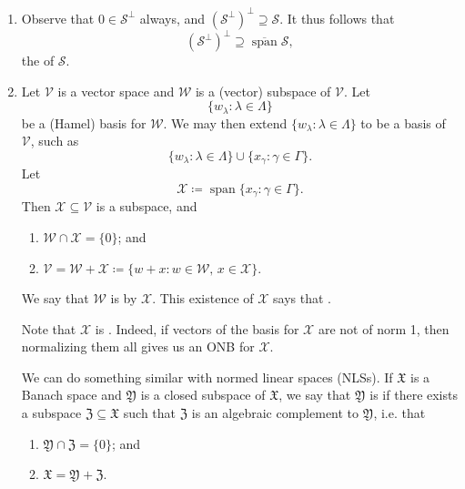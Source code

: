 \documentclass[notoc,notitlepage]{tufte-book}
\DeclareMathOperator{\Span}{span}
\begin{document}
\begin{remark}
  \begin{enumerate}
    \item Observe that $0 \in \mathcal{S}^{\perp}$ always,
      and $(\mathcal{S}^{\perp})^{\perp} \supseteq \mathcal{S}$.
      It thus follows that
      \begin{equation*}
        \left( \mathcal{S}^{\perp} \right)^{\perp} \supseteq \overline{\Span} \mathcal{S},
      \end{equation*}
      the  of $\mathcal{S}$.

    \item Let $\mathcal{V}$ is a vector space
      and $\mathcal{W}$ is a (vector) subspace of $\mathcal{V}$.
      Let
      \begin{equation*}
        \{ w_{\lambda} : \lambda \in \Lambda \}
      \end{equation*}
      be a (Hamel) basis for $\mathcal{W}$.
      We may then extend $\{ w_\lambda : \lambda \in \Lambda \}$
      to be a basis of $\mathcal{V}$, such as
      \begin{equation*}
        \{ w_\lambda : \lambda \in \Lambda \} \cup \{ x_\gamma : \gamma \in
        \Gamma \}.
      \end{equation*}
      Let
      \begin{equation*}
        \mathcal{X} \coloneqq \Span \{ x_\gamma : \gamma \in \Gamma \}.
      \end{equation*}
      Then $\mathcal{X} \subseteq \mathcal{V}$ is a subspace,
      and
      \begin{enumerate}
        \item $\mathcal{W} \cap \mathcal{X} = \{ 0 \}$; and
        \item $\mathcal{V} = \mathcal{W} + \mathcal{X} \coloneqq \{ w + x : w
          \in \mathcal{W},\, x \in \mathcal{X} \}$.
      \end{enumerate}
      We say that $\mathcal{W}$ is
       by $\mathcal{X}$.
      This existence of $\mathcal{X}$ says that .

      Note that $\mathcal{X}$ is .
      Indeed, if vectors of the basis for $\mathcal{X}$
      are not of norm 1, then normalizing them all
      gives us an ONB for $\mathcal{X}$.

      We can do something similar with normed linear spaces (NLSs).
      If $\mathfrak{X}$ is a Banach space
      and $\mathfrak{Y}$ is a closed subspace of $\mathfrak{X}$,
      we say that $\mathfrak{Y}$ is 
      if there exists a  subspace $\mathfrak{Z} \subseteq \mathfrak{X}$
      such that $\mathfrak{Z}$ is an algebraic complement to $\mathfrak{Y}$,
      i.e. that
      \begin{enumerate}
        \item $\mathfrak{Y} \cap \mathfrak{Z} = \{ 0 \}$; and
        \item $\mathfrak{X} = \mathfrak{Y} + \mathfrak{Z}$.
      \end{enumerate}


\end{enumerate}
\end{remark}
\end{document}
